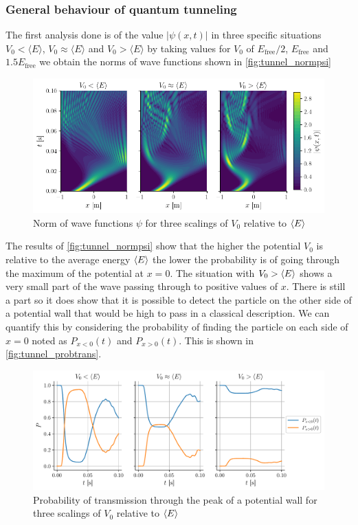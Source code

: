 \subsubsection{General behaviour of quantum tunneling}
The first analysis done is of the value $|\psi(x,t)|$ in three specific situations $V_0<\langle E \rangle$, $V_0\approx\langle E \rangle$ and $V_0>\langle E \rangle$ by taking values for $V_0$ of $E_\mathrm{free}/2$, $E_\mathrm{free}$ and $1.5 E_\mathrm{free}$ we obtain the norms of wave functions shown in \autoref{fig:tunnel_normpsi}
\begin{figure}[h]
    \centering
    \includegraphics[width = \linewidth]{figures/tunnel_normpsi.png}
    \caption{Norm of wave functions $\psi$ for three scalings of $V_0$ relative to $\langle E \rangle$}
    \label{fig:tunnel_normpsi}
\end{figure}

The results of \autoref{fig:tunnel_normpsi} show that the higher the potential $V_0$ is relative to the average energy $\langle E \rangle$ the lower the probability is of going through the maximum of the potential at $x=0$. The situation with $V_0 > \langle E \rangle$ shows a very small part of the wave passing through to positive values of $x$. There is still a part so it does show that it is possible to detect the particle on the other side of a potential wall that would be high to pass in a classical description. We can quantify this by considering the probability of finding the particle on each side of $x=0$ noted as $P_{x<0}(t)$ and $P_{x>0}(t)$. This is shown in \autoref{fig:tunnel_probtrans}.
\begin{figure}[h]
    \centering
    \includegraphics[width=\linewidth]{figures/tunnel_probtrans.pdf}
    \caption{Probability of transmission through the peak of a potential wall for three scalings of $V_0$ relative to $\langle E \rangle$}
    \label{fig:tunnel_probtrans}
\end{figure}

